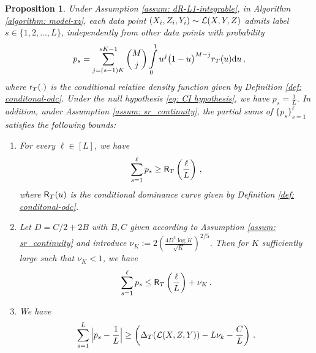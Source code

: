\documentclass[11pt]{article}
\newtheorem{propo}{Proposition}[section]
\begin{document}
\begin{propo}\label{propo: lambda_bound}
Under Assumption \ref{assum: dR-L1-integrable}, in Algorithm \ref{algorithm: model-xz}, each data point $(X_i,Z_i,Y_i)\sim \mathcal{L}(X,Y,Z)$ admits label $s\in \{1,2,...,L\}$, independently from other data points with probability
	\begin{equation}\label{eq: tp_j}
		{p}_s= \sum\limits_{j=(s-1)K}^{sK-1} \binom{M}{j}\int\limits_{0}^{1}u^{j}\big(1-u\big)^{M-j}r_{T}(u){\rm d} u\,,
	\end{equation} 
where $\mathsf{r}_T(.)$ is the conditional relative density function given by Definition \ref{def: conditonal-odc}. Under the null hypothesis \eqref{eq: CI hypothesis}, we have $p_{s}=\frac{1}{L}$. In addition, under Assumption \ref{assum: sr_continuity}, the partial sums of $\{p_s\}_{s=1}^\ell$  satisfies the following bounds:
	\begin{enumerate} [label=\roman*)]
		\item For every $\ell\in [L]$, we have 
		\begin{equation}\label{eq:sum-p_ell-lower}
			\sum\limits_{s=1}^{\ell}p_s \geq \mathsf{R}_{T}\left(\frac{\ell}{L}\right)\,,
		\end{equation}
where $\mathsf{R}_T(u)$ is the conditional dominance curve given by Definition \ref{def: conditonal-odc}.
		\item Let $D=C/2+2B$ with $B,C$ given according to Assumption \ref{assum: sr_continuity} and introduce $\nu_K:= 2\left(\frac{4D^2\log{K}}{\sqrt{K}}  \right)^{2/5}$. Then for $K$ sufficiently large such that $\nu_K<1$, we have 
		\begin{equation}\label{eq:sum-p_ell-upper}
			\sum\limits_{s=1}^{\ell}p_s \leq \mathsf{R}_{T}\left(\frac{\ell}{L}\right)+\nu_K
			\,.
		\end{equation}
		\item 
		We have
		\begin{equation}\label{eq: tmp10}
		\sum\limits_{s=1}^{L}\Big|p_s-\frac{1}{L}\Big|\geq 
		\left( \Delta_T(\mathcal{L}(X,Z,Y)) -L\nu_k-\frac{C}{L} \right)\,.	
		\end{equation}
\end{enumerate}
\end{propo}
\end{document}
